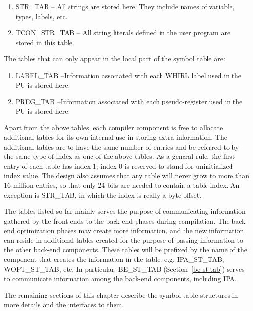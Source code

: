 \begin{enumerate}
\begin{figure}
\end{figure}



\item
{}%
STR\_TAB -- All strings are stored here. They include names of
variable, types, labels, etc. 

\item
{}%
TCON\_STR\_TAB -- All string literals defined in the user
  program are stored in this table.
\end{enumerate}

\noindent The tables that can only appear in the local part of the
symbol table are:

\begin{enumerate}
\item
{}%
LABEL\_TAB --Information associated with each WHIRL label used
in the
%
PU is stored here.

\item
{}%
PREG\_TAB --Information associated with each pseudo-register
used in the
%
PU is stored here.
\end{enumerate}

Apart from the above tables, each compiler component is free to
allocate additional tables for its own internal use in storing extra
information. The additional tables are to have the same number of
entries and be referred to by the same type of index as one of the
above tables. As a general rule, the first entry of each table has
index 1; index 0 is reserved to stand for uninitialized index
value. The design also assumes that any table will never grow to more
than 16 million entries, so that only 24 bits are needed to contain a
table index. An exception is STR\_TAB, in which the index is really a
byte offset.

The tables listed so far mainly serves the purpose of communicating
information gathered by the front-ends to the back-end phases during
compilation. The back-end optimization phases may create more
information, and the new information can reside in additional tables
created for the purpose of passing information to the other back-end
components. These tables will be prefixed by the name of the component
that creates the information in the table, e.g. IPA\_ST\_TAB,
WOPT\_ST\_TAB, etc. In particular,
%
BE\_ST\_TAB
(Section~\ref{be-st-tab}) serves to communicate information among the
back-end components, including IPA.

The remaining sections of this chapter describe the symbol table  
structures in more details and the interfaces to them.

